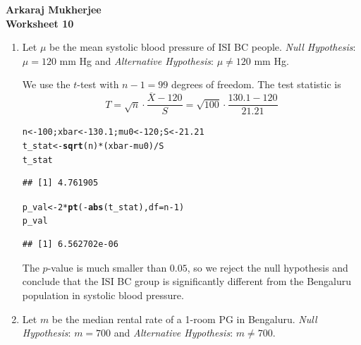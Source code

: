\documentclass[12pt,english]{article}\usepackage[]{graphicx}\usepackage[]{xcolor}
\makeatletter
\newcommand{\hlnum}[1]{\textcolor[rgb]{0.686,0.059,0.569}{#1}}%
\newcommand{\hlopt}[1]{\textcolor[rgb]{0,0,0}{#1}}%
\newcommand{\hldef}[1]{\textcolor[rgb]{0.345,0.345,0.345}{#1}}%
\newcommand{\hlkwb}[1]{\textcolor[rgb]{0.69,0.353,0.396}{#1}}%
\newcommand{\hlkwc}[1]{\textcolor[rgb]{0.333,0.667,0.333}{#1}}%
\newcommand{\hlkwd}[1]{\textcolor[rgb]{0.737,0.353,0.396}{\textbf{#1}}}%
\newenvironment{kframe}{%
 \def\at@end@of@kframe{}%
 \ifinner\ifhmode%
  \def\at@end@of@kframe{\end{minipage}}%
  \begin{minipage}{\columnwidth}%
 \fi\fi%
 \def\FrameCommand##1{\hskip\@totalleftmargin \hskip-\fboxsep
 \colorbox{shadecolor}{##1}\hskip-\fboxsep
     \hskip-\linewidth \hskip-\@totalleftmargin \hskip\columnwidth}%
 \MakeFramed {\advance\hsize-\width
   \@totalleftmargin\z@ \linewidth\hsize
   \@setminipage}}%
 {\par\unskip\endMakeFramed%
 \at@end@of@kframe}
\newenvironment{knitrout}{}{} %
\makeatother
\begin{document}
{\bf Arkaraj Mukherjee} \\
{\bf Worksheet 10}

\begin{enumerate}[label=\arabic*.]

\item Let $\mu$ be the mean systolic blood pressure of ISI BC people.
\textit{Null Hypothesis}: $\mu = 120$ mm Hg and \textit{Alternative Hypothesis}: $\mu \neq 120$ mm Hg.

We use the $t$-test with $n-1 = 99$ degrees of freedom. The test statistic is
\[
    T = \sqrt{n} \cdot \frac{\overline{X} - 120}{S} = \sqrt{100} \cdot \frac{130.1 - 120}{21.21}
\]
\begin{knitrout}
\color{fgcolor}\begin{kframe}
\begin{alltt}
\hldef{n} \hlkwb{<-} \hlnum{100}\hldef{; xbar} \hlkwb{<-} \hlnum{130.1}\hldef{; mu0} \hlkwb{<-} \hlnum{120}\hldef{; S} \hlkwb{<-} \hlnum{21.21}
\hldef{t_stat} \hlkwb{<-} \hlkwd{sqrt}\hldef{(n)} \hlopt{*} \hldef{(xbar} \hlopt{-} \hldef{mu0)} \hlopt{/} \hldef{S}
\hldef{t_stat}
\end{alltt}
\begin{verbatim}
## [1] 4.761905
\end{verbatim}
\begin{alltt}
\hldef{p_val} \hlkwb{<-} \hlnum{2} \hlopt{*} \hlkwd{pt}\hldef{(}\hlopt{-}\hlkwd{abs}\hldef{(t_stat),} \hlkwc{df} \hldef{= n} \hlopt{-} \hlnum{1}\hldef{)}
\hldef{p_val}
\end{alltt}
\begin{verbatim}
## [1] 6.562702e-06
\end{verbatim}
\end{kframe}
\end{knitrout}
The $p$-value is much smaller than $0.05$, so we reject the null hypothesis and conclude that the ISI BC group is significantly different from the Bengaluru population in systolic blood pressure.	

	\item Let $m$ be the median rental rate of a 1-room PG in Bengaluru.
	\textit{Null Hypothesis}: $m = 700$ and \textit{Alternative Hypothesis}: $m \neq 700$.
	

\end{enumerate}
\end{document}
